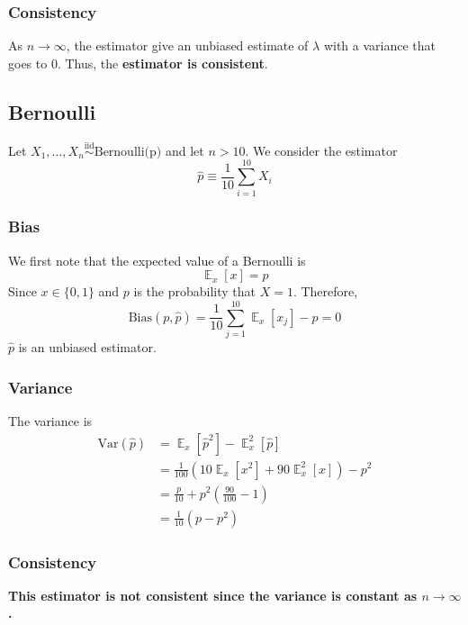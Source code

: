 \documentclass{article}
\DeclareMathOperator{\E}{\mathbb{E}}
\numberwithin{equation}{section}
\begin{document}
\subsubsection{Consistency}
As $n \rightarrow \infty$, the estimator give an unbiased estimate of $\lambda$ with 
a variance that goes to 0. Thus, the \textbf{estimator is consistent}. 


\subsection{Bernoulli}
Let $X_1,\dots,X_n \overset{\text{iid}}{\sim} \text{Bernoulli(p)} $ and let $n > 10$.
We consider the estimator 
 \[
         \hat{p} \equiv \frac{1}{10}\sum_{i = 1}^{10} X_i 
\]


\subsubsection{Bias}
We first note that the expected value of a Bernoulli is 
\[
        \E_x[x] = p
\]
Since $x \in  \{0,1\}$ and $p$ is the probability that  $X = 1$. Therefore,
\[
        \text{Bias}(p, \hat{p}) = \frac{1}{10}\sum_{j = 1}^{10} \E_x[x_j] - p = 0
\]
$\hat{p}$ is an unbiased estimator.


\subsubsection{Variance}
The variance is 
 \begin{align*}
         \text{Var}(\hat{p}) &= \E_x[\hat{p}^2] - \E_x^2[\hat{p}] \\
                             &= \frac{1}{100}\left(10 \E_x[x^2] + 90\E_x^2[x]  \right) - p^2 \\
                             &= \frac{p}{10} + p^2 \left(\frac{90}{100} - 1\right) \\
                             &= \frac{1}{10}(p - p^2)
\end{align*} 


\subsubsection{Consistency}
\textbf{This estimator is not consistent since the variance is constant as $n\rightarrow \infty$. }
\end{document}
